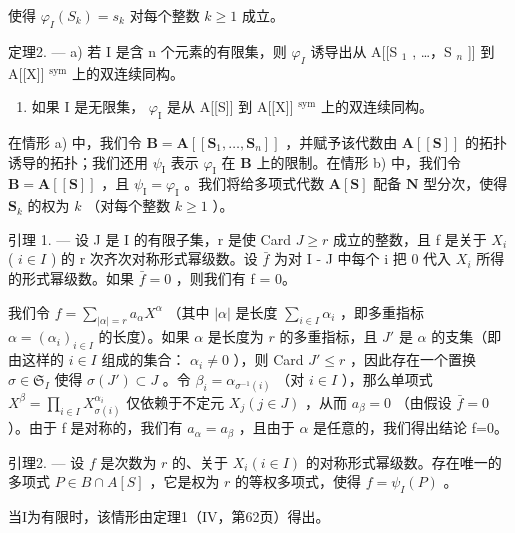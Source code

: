 使得 \(\varphi_{I}(S_{k}) = s_{k}\) 对每个整数 \(k\geqslant 1\) 成立。

定理2. --- a) 若 I 是含 n 个元素的有限集，则 \(\varphi_{I}\) 诱导出从 A{[}{[}S \(_{1}\) , \ldots，S \(_{n}\) {]}{]} 到 A{[}{[}X{]}{]} \(^{\text{sym}}\) 上的双连续同构。

\begin{enumerate}
\def\labelenumi{\alph{enumi})}
\setcounter{enumi}{1}
\tightlist
\item
  如果 I 是无限集， \(\varphi_{\mathrm{I}}\) 是从 A{[}{[}S{]}{]} 到 A{[}{[}X{]}{]} \(^{\mathrm{sym}}\) 上的双连续同构。
\end{enumerate}

在情形 a) 中，我们令 \(\mathbf{B} = \mathbf{A}[[\mathbf{S}_1, \ldots, \mathbf{S}_n]]\) ，并赋予该代数由 \(\mathbf{A}[[\mathbf{S}]]\) 的拓扑诱导的拓扑；我们还用 \(\psi_{\mathrm{I}}\) 表示 \(\varphi_{\mathrm{I}}\) 在 \(\mathbf{B}\) 上的限制。在情形 b) 中，我们令 \(\mathbf{B} = \mathbf{A}[[\mathbf{S}]]\) ，且 \(\psi_{\mathrm{I}} = \varphi_{\mathrm{I}}\) 。我们将给多项式代数 \(\mathbf{A}[\mathbf{S}]\) 配备 \(\mathbf{N}\) 型分次，使得 \(\mathbf{S}_k\) 的权为 \(k\) （对每个整数 \(k \geqslant 1\) ）。

引理 1. --- 设 J 是 I 的有限子集，r 是使 Card \(J \geqslant r\) 成立的整数，且 f 是关于 \(X_{i}\) ( \(i \in I\) ) 的 r 次齐次对称形式幂级数。设 \(\bar{f}\) 为对 I - J 中每个 i 把 0 代入 \(X_{i}\) 所得的形式幂级数。如果 \(\bar{f} = 0\) ，则我们有 f = 0。

我们令 \(f = \sum_{|\alpha| = r} a_{\alpha} X^{\alpha}\) （其中 \(|\alpha|\) 是长度 \(\sum_{i \in I} \alpha_i\) ，即多重指标 \(\alpha = (\alpha_i)_{i \in I}\) 的长度）。如果 \(\alpha\) 是长度为 \(r\) 的多重指标，且 \(J'\) 是 \(\alpha\) 的支集（即由这样的 \(i \in I\) 组成的集合： \(\alpha_i \neq 0\) ），则 Card \(J' \leqslant r\) ，因此存在一个置换 \(\sigma \in \mathfrak{S}_I\) 使得 \(\sigma(J') \subset J\) 。令 \(\beta_i = \alpha_{\sigma^{-1}(i)}\) （对 \(i \in I\) ），那么单项式 \(X^\beta = \prod_{i \in I} X_{\sigma(i)}^{\alpha_i}\) 仅依赖于不定元 \(X_j (j \in J)\) ，从而 \(a_\beta = 0\) （由假设 \(\bar{f}=0\) ）。由于 f 是对称的，我们有 \(a_{\alpha}=a_{\beta}\) ，且由于 \(\alpha\) 是任意的，我们得出结论 f=0。

引理2. --- 设 \(f\) 是次数为 \(r\) 的、关于 \(X_i (i \in I)\) 的对称形式幂级数。存在唯一的多项式 \(P \in B \cap A[S]\) ，它是权为 \(r\) 的等权多项式，使得 \(f = \psi_I(P)\) 。

当I为有限时，该情形由定理1（IV，第62页）得出。


